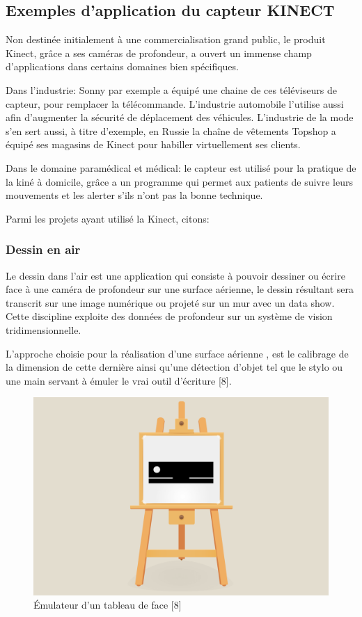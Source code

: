 \documentclass[12pt,a4paper,oneside]{book}
\begin{document}
	\subsection{Exemples d'application du capteur KINECT}
	Non destinée initialement à une commercialisation grand public, le produit Kinect, grâce a ses caméras de profondeur, a ouvert un immense champ d’applications dans certains domaines bien spécifiques.
	
	Dans l’industrie: Sonny par exemple a équipé une chaine de ces téléviseurs de capteur, pour remplacer la télécommande. L'industrie automobile l'utilise aussi afin d’augmenter la sécurité de déplacement des véhicules.
	L'industrie de la mode s'en sert aussi, à titre d'exemple,  en Russie la chaîne de vêtements Topshop a équipé ses magasins de Kinect pour habiller virtuellement ses clients.
	
	Dans le domaine paramédical et médical: le capteur est utilisé pour la pratique de la kiné à domicile, grâce a un programme qui permet aux patients de suivre leurs mouvements et les alerter s'ils n'ont pas la bonne technique.
	
	Parmi les projets ayant utilisé la Kinect, citons:
	
	\subsubsection{Dessin en air}
	Le dessin dans l'air est une application qui consiste à pouvoir dessiner ou écrire face à une caméra de profondeur sur une surface aérienne, le dessin résultant sera transcrit sur une image numérique ou projeté sur un mur avec un data show. Cette discipline exploite des données de profondeur sur un système de vision tridimensionnelle.
	
	L'approche choisie pour la réalisation d'une surface aérienne , est le calibrage de la dimension de cette dernière ainsi qu'une détection d'objet tel que le stylo ou une main servant à émuler le vrai outil d'écriture [8].
	
	\begin{figure}[H]
		\centering
		\includegraphics[scale=0.30]{kinect-drawing.png}
		\caption{Émulateur d'un tableau de face \textcolor[rgb]{1.00,0.00,0.00}{[8]}}
		\label{fig}
	\end{figure}
	
\end{document}
